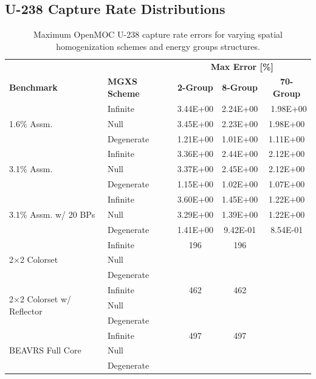 \subsection{U-238 Capture Rate Distributions}
\label{subsec:chap8-capt-rates}

\begin{table}[h!]
  \centering
  \caption[Maximum OpenMOC U-238 capture rate errors]{Maximum OpenMOC U-238 capture rate errors for varying spatial homogenization schemes and energy groups structures.}
  \small
  \label{table:chap8-openmoc-max-capt-rates}
  \vspace{6pt}
  \begin{tabular}{l l c c c}
  \toprule
  \rowcolor{lightgray}
  & & \multicolumn{3}{c}{\cellcolor{lightgray} \textbf{Max Error [\%]}} \\
  \multirow{-2}{*}{\cellcolor{lightgray} \bf Benchmark} &
  \multirow{-2}{*}{\cellcolor{lightgray} \bf \ac{MGXS} Scheme} &
  {\cellcolor{lightgray} \bf 2-Group} &
  {\cellcolor{lightgray} \bf 8-Group} &
  {\cellcolor{lightgray} \bf 70-Group} \\
  \midrule
\multirow{3}{*}{\parbox{2.5cm}{1.6\% Assm.}} & Infinite & 3.44E+00 & 2.24E+00 &\
 1.98E+00 \\
& Null & 3.45E+00 & 2.23E+00 & 1.98E+00 \\
& Degenerate & 1.21E+00 & 1.01E+00 & 1.11E+00 \\
  \midrule
  \multirow{3}{*}{\parbox{2.5cm}{3.1\% Assm.}} & Infinite & 3.36E+00 & 2.44E+00 & 2.12E+00 \\
& Null & 3.37E+00 & 2.45E+00 & 2.12E+00 \\
& Degenerate & 1.15E+00 & 1.02E+00 & 1.07E+00 \\
  \midrule
  \multirow{3}{*}{\parbox{2cm}{3.1\% Assm. w/ 20 BPs}} & Infinite & 3.60E+00 & 1.45E+00 & 1.22E+00 \\
& Null & 3.29E+00 & 1.39E+00 & 1.22E+00 \\
& Degenerate & 1.41E+00 & 9.42E-01 & 8.54E-01 \\
  \midrule
  \multirow{3}{*}{\parbox{2.5cm}{2$\times$2 Colorset}} & Infinite & 196 & 196 & \\
  & Null & & & \\
  & Degenerate & & & \\
  \midrule
  \multirow{3}{*}{\parbox{2.3cm}{2$\times$2 Colorset w/ Reflector}} & Infinite & 462 & 462 & \\
  & Null & & & \\
  & Degenerate & & & \\
  \midrule
  \multirow{3}{*}{\parbox{2cm}{\ac{BEAVRS} Full Core}} & Infinite & 497 & 497 & \\
  & Null & & & \\
  & Degenerate & & & \\
  \bottomrule
\end{tabular}
\end{table}

